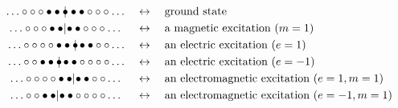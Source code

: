 \documentclass[a4paper,10pt]{article}
\newcommand{\hubert}[1]{$\framebox{\tiny h}$\ \textbf{\texttt{{\color{blue}\footnotesize#1}}}}
\newcommand{\linnea}[1]{$\framebox{\tiny L}$\ \textbf{\texttt{{\color{red}\footnotesize#1}}}}
\newcommand{\jesper}[1]{$\framebox{\tiny J}$\ \textbf{\texttt{{\color{cyan}\footnotesize#1}}}}
\begin{document}
\begin{equation*}
\begin{split}
\hdots\circ\circ\circ\bullet\bullet\bullet \hspace*{-4pt}|\hspace*{-2pt}\ \bullet\bullet\circ\circ\circ\hdots  
\quad  & \leftrightarrow \quad  \text{ground state} \\
\hdots\circ\circ\circ\bullet\bullet \hspace*{-2pt}|\hspace*{-2pt}\bullet\bullet\circ\circ\circ\hdots\hspace*{3.5pt}  \quad  & \leftrightarrow \quad \text{a magnetic excitation ($m=1$)} \\
\hdots\circ\circ\circ\circ\bullet\bullet\bullet\hspace*{-6pt}|\hspace*{-0pt}\bullet\bullet\circ\circ  \hdots \quad  & \leftrightarrow \quad \text{an electric excitation ($e=1$)} \\
\hdots\circ\circ\bullet\bullet\bullet\hspace*{-6pt}|\hspace*{-0pt}\bullet\bullet\circ\circ\circ\circ  \hdots \quad  & \leftrightarrow \quad \text{an electric excitation ($e=-1$)} \\
\hdots\circ\circ\circ\circ\bullet\bullet\hspace*{-0pt}|\hspace*{-2pt}\bullet\bullet\circ\circ\hdots\hspace*{3.5pt}  \quad  & \leftrightarrow \quad \text{an electromagnetic excitation $(e=1, m=1$)} \\
\hdots\circ\circ\bullet\bullet\hspace*{-0pt}|\hspace*{-2pt}\bullet\bullet\circ\circ\circ\circ\hdots\hspace*{3.5pt}  \quad  & \leftrightarrow \quad \text{an electromagnetic excitation $(e=-1, m=1$)} \\
\end{split}
\end{equation*}
\end{document}
